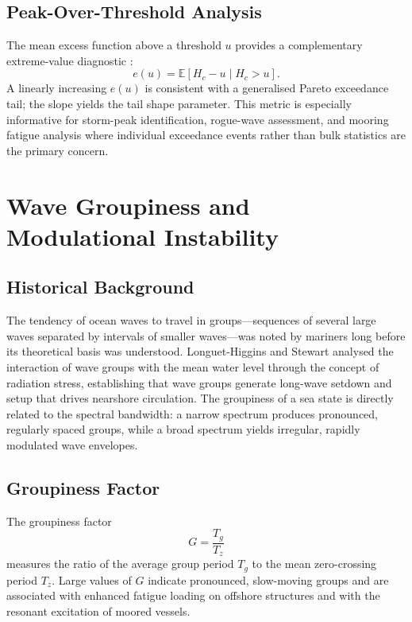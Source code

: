 \documentclass[journal]{IEEEtran}
\begin{document}
    \subsection{Peak-Over-Threshold Analysis}

    The mean excess function above a threshold $u$ provides a complementary
    extreme-value diagnostic \cite{Coles2001}:
    \begin{equation}
        e(u) = \mathbb{E}[H_c - u \mid H_c > u].
    \end{equation}
    A linearly increasing $e(u)$ is consistent with a generalised Pareto
    exceedance tail; the slope yields the tail shape parameter.
    This metric is especially informative for storm-peak identification,
    rogue-wave assessment, and mooring fatigue analysis where individual
    exceedance events rather than bulk statistics are the primary concern.

    \section{Wave Groupiness and Modulational Instability}
    \label{sec:groupiness}

    \subsection{Historical Background}

    The tendency of ocean waves to travel in groups---sequences of several
    large waves separated by intervals of smaller waves---was noted by
    mariners long before its theoretical basis was understood.
    Longuet-Higgins and Stewart \cite{LonguetHigginsStewart1964} analysed
    the interaction of wave groups with the mean water level through the
    concept of radiation stress, establishing that wave groups generate
    long-wave setdown and setup that drives nearshore circulation.
    The groupiness of a sea state is directly related to the spectral
    bandwidth: a narrow spectrum produces pronounced, regularly spaced
    groups, while a broad spectrum yields irregular, rapidly modulated
    wave envelopes.

    \subsection{Groupiness Factor}

    The groupiness factor
    \begin{equation}
        G = \frac{T_g}{T_z}
    \end{equation}
    measures the ratio of the average group period $T_g$ to the mean
    zero-crossing period $T_z$.
    Large values of $G$ indicate pronounced, slow-moving groups and are
    associated with enhanced fatigue loading on offshore structures and
    with the resonant excitation of moored vessels.
\end{document}
